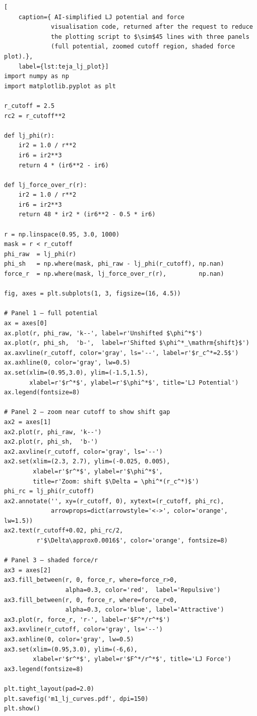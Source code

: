 \begin{lstlisting}[
    caption={ AI-simplified LJ potential and force
             visualisation code, returned after the request to reduce
             the plotting script to $\sim$45 lines with three panels
             (full potential, zoomed cutoff region, shaded force plot).},
    label={lst:teja_lj_plot}]
import numpy as np
import matplotlib.pyplot as plt
 
r_cutoff = 2.5
rc2 = r_cutoff**2
 
def lj_phi(r):
    ir2 = 1.0 / r**2
    ir6 = ir2**3
    return 4 * (ir6**2 - ir6)
 
def lj_force_over_r(r):
    ir2 = 1.0 / r**2
    ir6 = ir2**3
    return 48 * ir2 * (ir6**2 - 0.5 * ir6)
 
r = np.linspace(0.95, 3.0, 1000)
mask = r < r_cutoff
phi_raw  = lj_phi(r)
phi_sh   = np.where(mask, phi_raw - lj_phi(r_cutoff), np.nan)
force_r  = np.where(mask, lj_force_over_r(r),         np.nan)
 
fig, axes = plt.subplots(1, 3, figsize=(16, 4.5))
 
# Panel 1 — full potential
ax = axes[0]
ax.plot(r, phi_raw, 'k--', label=r'Unshifted $\phi^*$')
ax.plot(r, phi_sh,  'b-',  label=r'Shifted $\phi^*_\mathrm{shift}$')
ax.axvline(r_cutoff, color='gray', ls='--', label=r'$r_c^*=2.5$')
ax.axhline(0, color='gray', lw=0.5)
ax.set(xlim=(0.95,3.0), ylim=(-1.5,1.5),
       xlabel=r'$r^*$', ylabel=r'$\phi^*$', title='LJ Potential')
ax.legend(fontsize=8)
 
# Panel 2 — zoom near cutoff to show shift gap
ax2 = axes[1]
ax2.plot(r, phi_raw, 'k--')
ax2.plot(r, phi_sh,  'b-')
ax2.axvline(r_cutoff, color='gray', ls='--')
ax2.set(xlim=(2.3, 2.7), ylim=(-0.025, 0.005),
        xlabel=r'$r^*$', ylabel=r'$\phi^*$',
        title=r'Zoom: shift $\Delta = \phi^*(r_c^*)$')
phi_rc = lj_phi(r_cutoff)
ax2.annotate('', xy=(r_cutoff, 0), xytext=(r_cutoff, phi_rc),
             arrowprops=dict(arrowstyle='<->', color='orange', lw=1.5))
ax2.text(r_cutoff+0.02, phi_rc/2,
         r'$\Delta\approx0.0016$', color='orange', fontsize=8)
 
# Panel 3 — shaded force/r
ax3 = axes[2]
ax3.fill_between(r, 0, force_r, where=force_r>0,
                 alpha=0.3, color='red',  label='Repulsive')
ax3.fill_between(r, 0, force_r, where=force_r<0,
                 alpha=0.3, color='blue', label='Attractive')
ax3.plot(r, force_r, 'r-', label=r'$F^*/r^*$')
ax3.axvline(r_cutoff, color='gray', ls='--')
ax3.axhline(0, color='gray', lw=0.5)
ax3.set(xlim=(0.95,3.0), ylim=(-6,6),
        xlabel=r'$r^*$', ylabel=r'$F^*/r^*$', title='LJ Force')
ax3.legend(fontsize=8)
 
plt.tight_layout(pad=2.0)
plt.savefig('m1_lj_curves.pdf', dpi=150)
plt.show()
\end{lstlisting}
 
